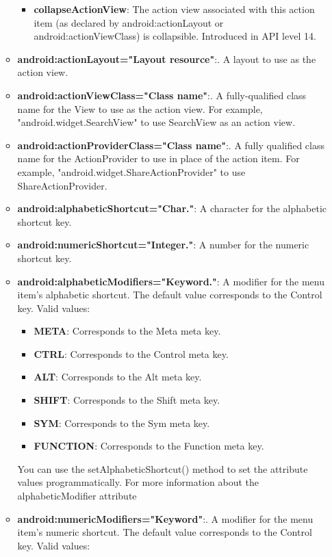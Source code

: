 \documentclass{report}
\begin{document}
\begin{itemize}
\begin{itemize}
\begin{itemize}
                        \item \textbf{collapseActionView}:	The action view associated with this action item (as declared by android:actionLayout or android:actionViewClass) is collapsible. Introduced in API level 14.
                    \end{itemize}
                \item \textbf{android:actionLayout="Layout resource"}:. A layout to use as the action view.
                \item \textbf{android:actionViewClass="Class name"}:. A fully-qualified class name for the View to use as the action view. For example, "android.widget.SearchView" to use SearchView as an action view.
                \item \textbf{android:actionProviderClass="Class name"}:. A fully qualified class name for the ActionProvider to use in place of the action item. For example, "android.widget.ShareActionProvider" to use ShareActionProvider.
                \item \textbf{android:alphabeticShortcut="Char."}: A character for the alphabetic shortcut key.
                \item \textbf{android:numericShortcut="Integer."}: A number for the numeric shortcut key.
                \item \textbf{android:alphabeticModifiers="Keyword."}: A modifier for the menu item's alphabetic shortcut. The default value corresponds to the Control key. Valid values:
                    \begin{itemize}
                        \item \textbf{META}:	Corresponds to the Meta meta key.
                        \item \textbf{CTRL}:	Corresponds to the Control meta key.
                        \item \textbf{ALT}:	Corresponds to the Alt meta key.
                        \item \textbf{SHIFT}:	Corresponds to the Shift meta key.
                        \item \textbf{SYM}:	Corresponds to the Sym meta key.
                        \item \textbf{FUNCTION}:	Corresponds to the Function meta key.
                    \end{itemize}
                    You can use the setAlphabeticShortcut() method to set the attribute values programmatically. For more information about the alphabeticModifier attribute
                \item \textbf{android:numericModifiers="Keyword"}:. A modifier for the menu item's numeric shortcut. The default value corresponds to the Control key. Valid values:

\end{itemize}
\end{itemize}
\end{document}
